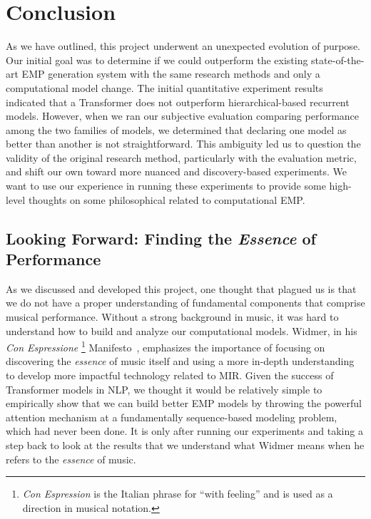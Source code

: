 \chapter{Conclusion} \label{ch:ch8}
As we have outlined, this project underwent an unexpected evolution of purpose. Our initial goal was to determine if we could outperform the existing state-of-the-art EMP generation system with the same research methods and only a computational model change. The initial quantitative experiment results indicated that a Transformer does not outperform hierarchical-based recurrent models. However, when we ran our subjective evaluation comparing performance among the two families of models, we determined that declaring one model as better than another is not straightforward. This ambiguity led us to question the validity of the original research method, particularly with the evaluation metric, and shift our own toward more nuanced and discovery-based experiments. We want to use our experience in running these experiments to provide some high-level thoughts on some philosophical related to computational EMP. 

\section{Looking Forward: Finding the \emph{Essence} of Performance}
As we discussed and developed this project, one thought that plagued us is that we do not have a proper understanding of fundamental components that comprise musical performance. Without a strong background in music, it was hard to understand how to build and analyze our computational models. Widmer, in his \emph{Con Espressione}%
\footnote{\emph{Con Espression} is the Italian phrase for ``with feeling'' and is used as a direction in musical notation.} Manifesto~\cite{widmer2016getting}, emphasizes the importance of focusing on discovering the \emph{essence} of music itself and using a more in-depth understanding to develop more impactful technology related to MIR. Given the success of Transformer models in NLP, we thought it would be relatively simple to empirically show that we can build better EMP models by throwing the powerful attention mechanism at a fundamentally sequence-based modeling problem, which had never been done. It is only after running our experiments and taking a step back to look at the results that we understand what Widmer means when he refers to the \emph{essence} of music. 

